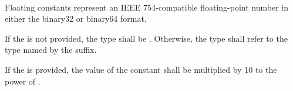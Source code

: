 
\begin{grammar}
 \\
	     \\
	   \\

 \oneof \\
	 \\

 \\
	  \\

 \oneof \\
	 \\

 \\
	  \\
\end{grammar}


Floating constants represent an IEEE 754-compatible floating-point
number in either the binary32 or binary64 format.

\specsubitem
If the  is not provided, the type shall be
. Otherwise, the type shall refer to the type named by the suffix.

\specsubitem
If the  is provided, the value of the
constant shall be multiplied by 10 to the power of
.


